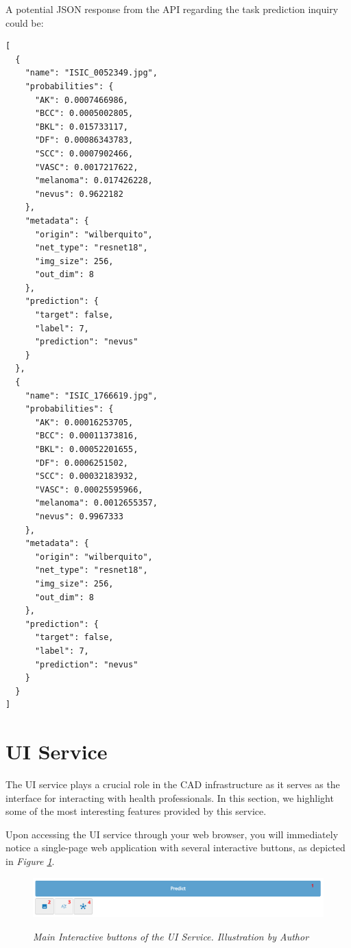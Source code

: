 A potential JSON response from the API regarding the task prediction inquiry could be:

\begin{Verbatim}[fontsize=\scriptsize]
[
  {
    "name": "ISIC_0052349.jpg",
    "probabilities": {
      "AK": 0.0007466986,
      "BCC": 0.0005002805,
      "BKL": 0.015733117,
      "DF": 0.00086343783,
      "SCC": 0.0007902466,
      "VASC": 0.0017217622,
      "melanoma": 0.017426228,
      "nevus": 0.9622182
    },
    "metadata": {
      "origin": "wilberquito",
      "net_type": "resnet18",
      "img_size": 256,
      "out_dim": 8
    },
    "prediction": {
      "target": false,
      "label": 7,
      "prediction": "nevus"
    }
  },
  {
    "name": "ISIC_1766619.jpg",
    "probabilities": {
      "AK": 0.00016253705,
      "BCC": 0.00011373816,
      "BKL": 0.00052201655,
      "DF": 0.0006251502,
      "SCC": 0.00032183932,
      "VASC": 0.00025595966,
      "melanoma": 0.0012655357,
      "nevus": 0.9967333
    },
    "metadata": {
      "origin": "wilberquito",
      "net_type": "resnet18",
      "img_size": 256,
      "out_dim": 8
    },
    "prediction": {
      "target": false,
      "label": 7,
      "prediction": "nevus"
    }
  }
]
\end{Verbatim}

\section{UI Service}

The UI service plays a crucial role in the CAD infrastructure as it serves as the interface for interacting with health professionals. In this section, we highlight some of the most interesting features provided by this service.

Upon accessing the UI service through your web browser, you will immediately notice a single-page web application with several interactive buttons, as depicted in \textit{Figure \ref{fig:ui-tools}}.

\begin{figure}[H]
\centering
    \includegraphics[width=\textwidth]{imatges/results/ui-tools.png}
\caption[Main Interactive buttons of the UI Service]{\textit{Main Interactive buttons of the UI Service. Illustration by Author}}
{\label{fig:ui-tools}}
\end{figure}

